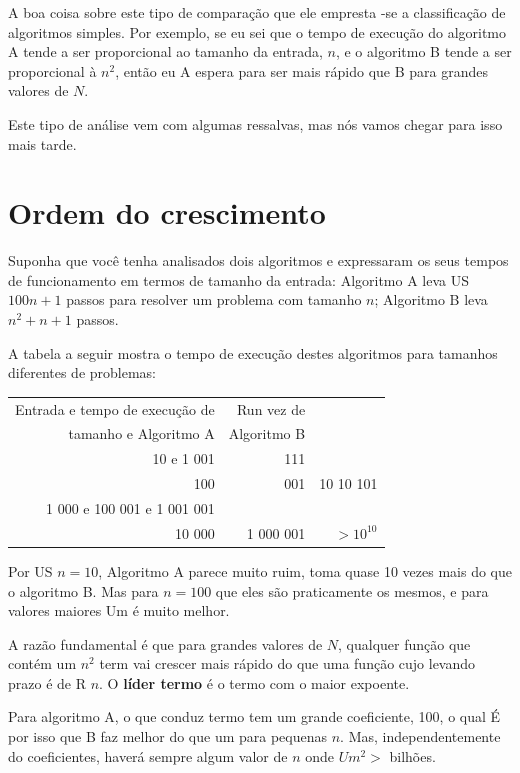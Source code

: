 \documentclass[10pt]{book}
\begin{document}
\begin{v erbatim}
\begin{itemize}
\end{itemize}

A boa coisa sobre este tipo de comparação que ele empresta
-se a classificação de algoritmos simples. Por exemplo,
se eu sei que o tempo de execução do algoritmo A tende a ser
proporcional ao tamanho da entrada, $ n $, e o algoritmo B
tende a ser proporcional à $ n ^ 2 $, então eu
A espera para ser mais rápido que B para grandes valores de $ N $.

Este tipo de análise vem com algumas ressalvas, mas nós vamos chegar
para isso mais tarde.


\section{Ordem do crescimento}

Suponha que você tenha analisados ​​dois algoritmos e expressaram
os seus tempos de funcionamento em termos de tamanho da entrada:
Algoritmo A leva US $ 100n +1 $ passos para resolver um problema com
tamanho $ n $; Algoritmo B leva $ n ^ 2 + n + 1 $ passos.

A tabela a seguir mostra o tempo de execução destes algoritmos
para tamanhos diferentes de problemas:

\begin{tabular} {| r | r | r |}
\hline
Entrada e tempo de execução de & Run vez de \\
tamanho e Algoritmo A & Algoritmo B \\
\hline
10 e 1 001 & 111 \\
100 & 001 & 10 10 101 \\
1 000 e 100 001 e 1 001 001 \\
10 000 & 1 000 001 & $> 10 ^ {10} $ \\
\hline
\end{tabular}

Por US $ n = 10 $, Algoritmo A parece muito ruim, toma quase 10 vezes
mais do que o algoritmo B. Mas para $ n = 100 $ que eles são praticamente os mesmos, e
para valores maiores Um é muito melhor.

A razão fundamental é que para grandes valores de $ N $, qualquer função
que contém um $ n ^ 2 $ term vai crescer mais rápido do que uma função cujo
levando prazo é de R $ n $. O {\bf líder termo} é o termo com o
maior expoente.

Para algoritmo A, o que conduz termo tem um grande coeficiente, 100, o qual
É por isso que B faz melhor do que um para pequenas $ n $. Mas, independentemente do
coeficientes, haverá sempre algum valor de $ n $ onde
$ Um ^ 2> $ bilhões.


\end{v erbatim}
\end{document}
